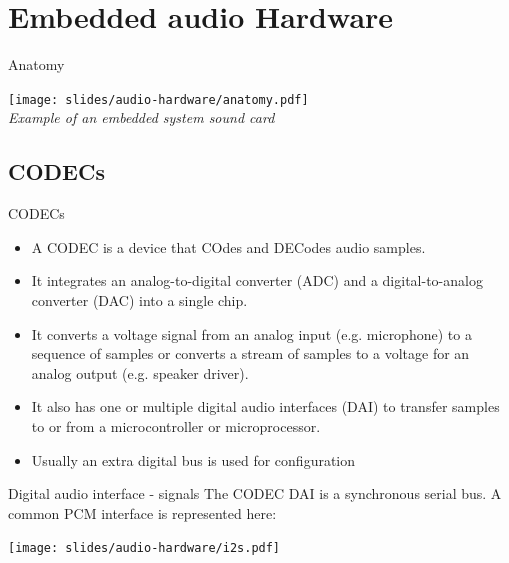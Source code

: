 \section{Embedded audio Hardware}

\begin{frame}{Anatomy}
  \begin{center}
    \texttt{[image: slides/audio-hardware/anatomy.pdf]}\\
    {\em Example of an embedded system sound card}
  \end{center}
\end{frame}

\subsection{CODECs}

\begin{frame}{CODECs}
  \begin{itemize}
  \item A CODEC is a device that COdes and DECodes audio samples.
  \item It integrates an analog-to-digital converter (ADC) and a
    digital-to-analog converter (DAC) into a single chip.
  \item It converts a voltage signal from an analog input (e.g.
    microphone) to a sequence of samples or converts a stream of
    samples to a voltage for an analog output (e.g. speaker driver).
  \item It also has one or multiple digital audio interfaces (DAI) to
    transfer samples to or from a microcontroller or microprocessor.
  \item Usually an extra digital bus is used for configuration
  \end{itemize}
\end{frame}

\begin{frame}[fragile]{Digital audio interface - signals}
  The CODEC DAI is a synchronous serial bus. A common PCM interface is
  represented here:
  \begin{center}
    \texttt{[image: slides/audio-hardware/i2s.pdf]}\\
  \end{center}
\end{frame}


